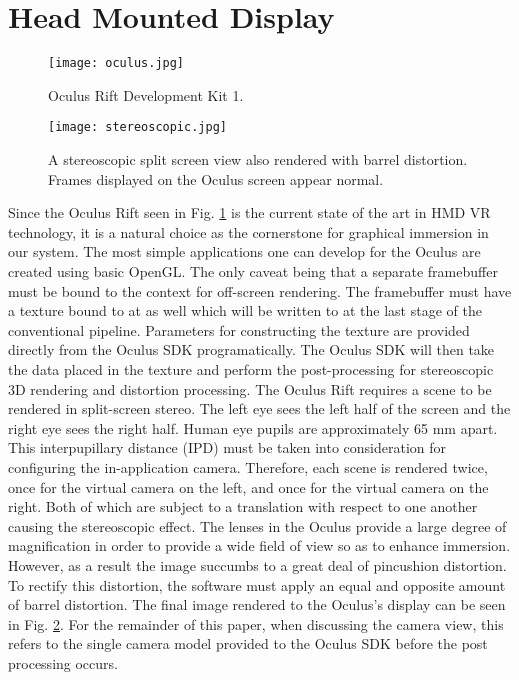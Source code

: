 \section{Head Mounted Display}
\label{sec:hmd}

\begin{figure}[!b]
\centering
\texttt{[image: oculus.jpg]}
\caption{Oculus Rift Development Kit 1. 
\cite{website:pcworld}}
\label{fig:oculus}
\end{figure}

\begin{figure}[]
\centering
\texttt{[image: stereoscopic.jpg]}
\caption{A stereoscopic split screen view also rendered with barrel distortion.
Frames displayed on the Oculus screen appear normal.}
\label{fig:stereo}
\end{figure}

Since the Oculus Rift seen in Fig. \ref{fig:oculus} is the current state of the
art in HMD VR technology, it is a natural choice as the cornerstone for
graphical immersion in our system. The most simple applications one can develop
for the Oculus are created using basic OpenGL. The only caveat being that a
separate framebuffer must be bound to the context for off-screen rendering. The
framebuffer must have a texture bound to at as well which will be written to at
the last stage of the conventional pipeline. Parameters for constructing the
texture are provided directly from the Oculus SDK programatically.  The Oculus
SDK will then take the data placed in the texture and perform the
post-processing for stereoscopic 3D rendering and distortion processing. The
Oculus Rift requires a scene to be rendered in split-screen stereo. The left
eye sees the left half of the screen and the right eye sees the right half.
Human eye pupils are approximately 65 mm apart.  This interpupillary distance
(IPD) must be taken into consideration for configuring the in-application
camera.  Therefore, each scene is rendered twice, once for the virtual camera
on the left, and once for the virtual camera on the right. Both of which are
subject to a translation with respect to one another causing the stereoscopic
effect. The lenses in the Oculus provide a large degree of magnification in
order to provide a wide field of view so as to enhance immersion. However, as a
result the image succumbs to a great deal of pincushion distortion. To rectify
this distortion, the software must apply an equal and opposite amount of barrel
distortion. The final image rendered to the Oculus's display can be seen in
Fig. \ref{fig:stereo}. For the remainder of this paper, when discussing the
camera view, this refers to the single camera model provided to the Oculus SDK
before the post processing occurs. 

